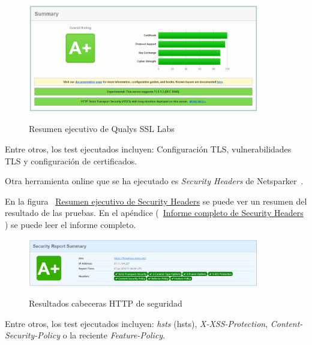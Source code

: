 \begin{figure}[!ht]
  \includegraphics[width=0.9\textwidth]{fig/SSLTLS_Report_Summary}
  \label{tabla:resumenqualys}
  \caption{Resumen ejecutivo de Qualys SSL Labs}
\end{figure}
\par Entre otros, los test ejecutados incluyen: Configuración TLS, vulnerabilidades TLS y configuración de certificados.

\par Otra herramienta online que se ha ejecutado es {\em Security Headers} de Netsparker~\cite{securityheaders}.
\par En la figura ~\hyperref[tabla:resumensecurityheaders]{Resumen ejecutivo de Security Headers} se puede ver un resumen del resultado de las pruebas. En el apéndice
(~\hyperref[tabla:informesecurityheaders]{Informe completo de Security Headers} ) se puede leer el informe completo.

\begin{figure}[!ht]
  \includegraphics[width=0.9\textwidth]{fig/SecurityHeaders_Report_Summary}
  \label{tabla:resumensecurityheaders}
  \caption{Resultados cabeceras HTTP de seguridad}
\end{figure}
Entre otros, los test ejecutados incluyen: {\em \acrlong{hsts}} (\acrshort{hsts}), {\em X-XSS-Protection}, {\em Content-Security-Policy} o la reciente {\em Feature-Policy}.

